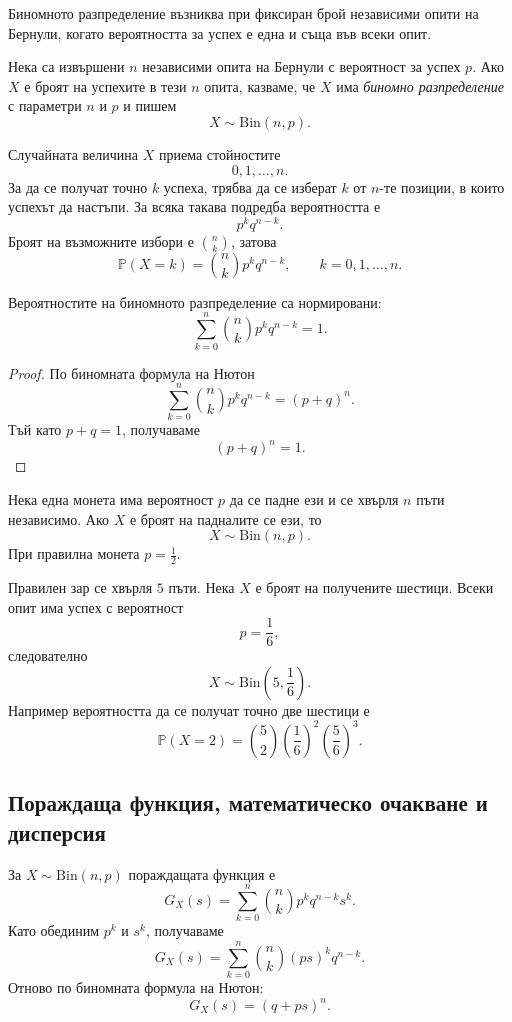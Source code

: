 Биномното разпределение възниква при фиксиран брой независими опити на Бернули, когато вероятността за успех е една и съща във всеки опит.

\begin{defn}
Нека са извършени $n$ независими опита на Бернули с вероятност за успех $p$. Ако $X$ е броят на успехите в тези $n$ опита, казваме, че $X$ има \emph{биномно разпределение} с параметри $n$ и $p$ и пишем
\[
X\sim\mathrm{Bin}(n,p).
\]
\end{defn}

Случайната величина $X$ приема стойностите
\[
0,1,\ldots,n.
\]
За да се получат точно $k$ успеха, трябва да се изберат $k$ от $n$-те позиции, в които успехът да настъпи. За всяка такава подредба вероятността е
\[
p^kq^{n-k}.
\]
Броят на възможните избори е $\binom{n}{k}$, затова
\[
\mathbb{P}(X=k)=\binom{n}{k}p^kq^{n-k},
\qquad k=0,1,\ldots,n.
\]

\begin{prop}
Вероятностите на биномното разпределение са нормировани:
\[
\sum_{k=0}^{n}\binom{n}{k}p^kq^{n-k}=1.
\]
\end{prop}

\begin{proof}
По биномната формула на Нютон
\[
\sum_{k=0}^{n}\binom{n}{k}p^kq^{n-k}=(p+q)^n.
\]
Тъй като $p+q=1$, получаваме
\[
(p+q)^n=1.
\]
\end{proof}

\begin{example}
Нека една монета има вероятност $p$ да се падне ези и се хвърля $n$ пъти независимо. Ако $X$ е броят на падналите се ези, то
\[
X\sim\mathrm{Bin}(n,p).
\]
При правилна монета $p=\frac12$.
\end{example}

\begin{example}
Правилен зар се хвърля $5$ пъти. Нека $X$ е броят на получените шестици. Всеки опит има успех с вероятност
\[
p=\frac16,
\]
следователно
\[
X\sim\mathrm{Bin}\left(5,\frac16\right).
\]
Например вероятността да се получат точно две шестици е
\[
\mathbb{P}(X=2)
=
\binom52\left(\frac16\right)^2
\left(\frac56\right)^3.
\]
\end{example}

\subsection{Пораждаща функция, математическо очакване и дисперсия}\label{s:35.3.2}

За $X\sim\mathrm{Bin}(n,p)$ пораждащата функция е
\[
G_X(s)
=
\sum_{k=0}^{n}\binom{n}{k}p^kq^{n-k}s^k.
\]
Като обединим $p^k$ и $s^k$, получаваме
\[
G_X(s)
=
\sum_{k=0}^{n}\binom{n}{k}(ps)^kq^{n-k}.
\]
Отново по биномната формула на Нютон:
\[
G_X(s)=(q+ps)^n.
\]

